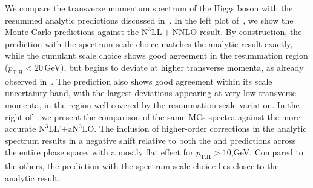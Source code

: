 \documentclass[11pt,a4paper]{article}
\begin{document}
We compare the transverse momentum spectrum of the Higgs boson with the resummed analytic predictions discussed in~. In the left plot of~, we show the Monte Carlo predictions against the $\text{N}^3\text{LL}+\text{NNLO}$ result. By construction, the \GENEVA{} prediction with the spectrum scale choice matches the analytic result exactly, while the cumulant scale choice shows good agreement in the resummation region ($p_{\text{T,H}} < 20$\,GeV), but begins to deviate at higher transverse momenta, as already observed in~. The \minnlo{} prediction also shows good agreement within its scale uncertainty band, with the largest deviations appearing at very low transverse momenta, in the region well covered by the resummation scale variation. In the right of~, we present the comparison of the same MCs spectra against the more accurate $\text{N}^3\text{LL'+aN}^3\text{LO}$. The inclusion of higher-order corrections in the analytic spectrum results in a negative shift relative to both the \minnlo{} and \GENEVA{} predictions across the entire phase space, with a mostly flat effect for $p_{\text{T,H}} > 10$,GeV. Compared to the others, the \GENEVA{} prediction with the spectrum scale choice lies closer to the analytic result.
\end{document}
